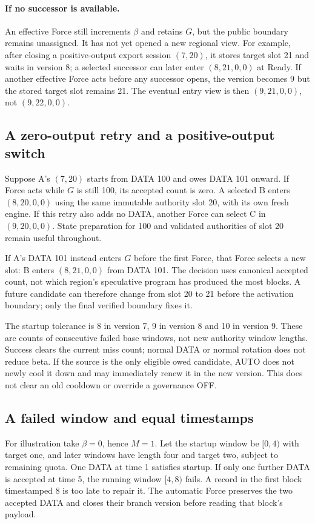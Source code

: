 \documentclass[11pt,a4paper]{article}
\begin{document}
\paragraph{If no successor is available.}
An effective Force still increments $\beta$ and retains $G$, but the
public boundary remains unassigned. It has not yet opened a new regional view.
For example, after closing a positive-output export session $(7,20)$,
it stores target slot 21 and waits in version 8; a selected successor
can later enter $(8,21,0,0)$ at Ready.
If another effective Force acts before any successor opens, the version
becomes 9 but the stored target slot remains 21. The eventual
entry view is then $(9,21,0,0)$, not $(9,22,0,0)$.

\subsection{A zero-output retry and a positive-output switch}
\label{sec:retry-example}
Suppose A's $(7,20)$ starts from DATA 100 and owes DATA 101 onward.
If Force acts while $G$ is still 100, its accepted count is zero.
A selected B enters $(8,20,0,0)$ using the same immutable authority
slot 20, with its own fresh engine. If this retry also adds no DATA,
another Force can select C in $(9,20,0,0)$. State preparation for 100
and validated authorities of slot 20 remain useful throughout.

If A's DATA 101 instead enters $G$ before the first Force, that Force
selects a new slot: B enters $(8,21,0,0)$ from DATA 101. The decision
uses canonical accepted count, not which region's speculative program
has produced the most blocks. A future candidate can therefore change
from slot 20 to 21 before the activation boundary; only the final
verified boundary fixes it.

The startup tolerance is 8 in version 7, 9 in version 8 and 10 in
version 9. These are counts of consecutive failed base windows, not
new authority window lengths. Success clears the current miss count;
normal DATA or normal rotation does not reduce beta. If the source is
the only eligible owed candidate, AUTO does not newly cool it down and
may immediately renew it in the new version. This does not clear an old
cooldown or override a governance OFF.

\subsection{A failed window and equal timestamps}
\label{sec:window-example}
For illustration take $\beta=0$, hence $M=1$. Let the startup window
be $[0,4)$ with target one,
and later windows have length four and target two, subject to remaining
quota. One DATA at time 1 satisfies startup. If only one further DATA
is accepted at time 5, the running window $[4,8)$ fails.
A record in the first block timestamped 8 is too late to repair it.
The automatic Force preserves the two accepted DATA and closes their
branch version before reading that block's payload.
\end{document}
